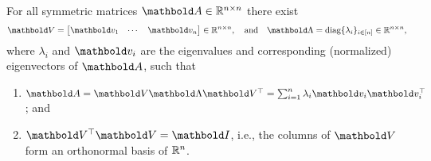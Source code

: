 \begin{thm} For all symmetric matrices $\mA \in \R^{n \times n}$ there exist \begin{align}
    \mV = \begin{bmatrix}
    \vv_1 & \cdots & \vv_n
    \end{bmatrix} \in \R^{n \times n}, \quad \text{and} \quad \mLambda = \diag\{\lambda_i\}_{i \in [n]} \in \R^{n \times n},
\end{align} where $\lambda_i$ and $\vv_i$ are the eigenvalues and corresponding (normalized) eigenvectors of $\mA$, such that \begin{enumerate}
    \item $\mA = \mV\mLambda\trans{\mV} = \sum_{i=1}^n \lambda_i \vv_i \trans{\vv_i}$; and
    \item $\trans{\mV}\mV = \mI$, i.e., the columns of $\mV$ form an orthonormal basis of $\mathbb{R}^n$.
\end{enumerate}
\end{thm}


